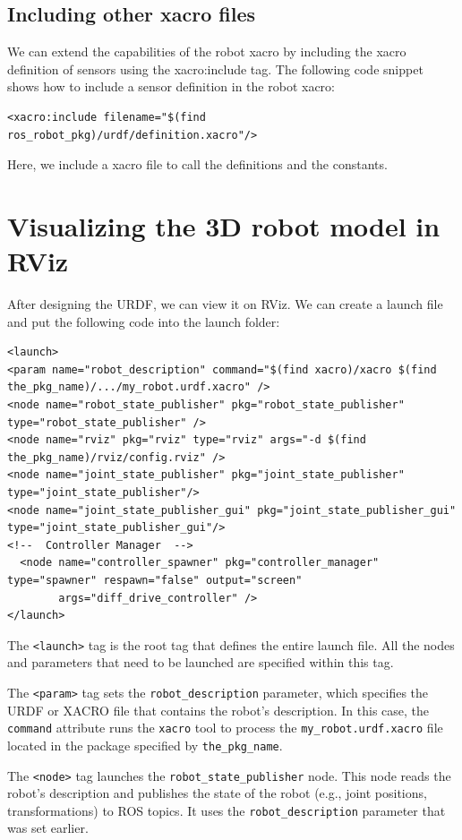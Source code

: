 \documentclass[../../main]{subfiles}
\begin{document}
\subsection{Including other xacro files}
We can extend the capabilities of the robot xacro by including the xacro definition of
sensors using the xacro:include tag. The following code snippet shows how to include
a sensor definition in the robot xacro:
\begin{verbatim}
<xacro:include filename="$(find ros_robot_pkg)/urdf/definition.xacro"/>
\end{verbatim}
Here, we include a xacro file to call the definitions and the constants. 

\section{Visualizing the 3D robot model in RViz}
After designing the URDF, we can view it on RViz.
We can create a launch file and put the following code into the launch folder:
\begin{verbatim}
<launch>
<param name="robot_description" command="$(find xacro)/xacro $(find the_pkg_name)/.../my_robot.urdf.xacro" />
<node name="robot_state_publisher" pkg="robot_state_publisher" type="robot_state_publisher" />
<node name="rviz" pkg="rviz" type="rviz" args="-d $(find the_pkg_name)/rviz/config.rviz" />
<node name="joint_state_publisher" pkg="joint_state_publisher" 
type="joint_state_publisher"/>
<node name="joint_state_publisher_gui" pkg="joint_state_publisher_gui" type="joint_state_publisher_gui"/>
<!--  Controller Manager  -->
  <node name="controller_spawner" pkg="controller_manager" type="spawner" respawn="false" output="screen"
        args="diff_drive_controller" /> 
</launch>
    \end{verbatim}
    The \texttt{<launch>} tag is the root tag that defines the entire launch file. All the nodes and parameters that need to be launched are specified within this tag.

    The \texttt{<param>} tag sets the \texttt{robot\_description} parameter, which specifies the URDF or XACRO file that contains the robot’s description. In this case, the \texttt{command} attribute runs the \texttt{xacro} tool to process the \texttt{my\_robot.urdf.xacro} file located in the package specified by \texttt{the\_pkg\_name}.
    
    The \texttt{<node>} tag launches the \texttt{robot\_state\_publisher} node. This node reads the robot’s description and publishes the state of the robot (e.g., joint positions, transformations) to ROS topics. It uses the \texttt{robot\_description} parameter that was set earlier.
    
\end{document}

